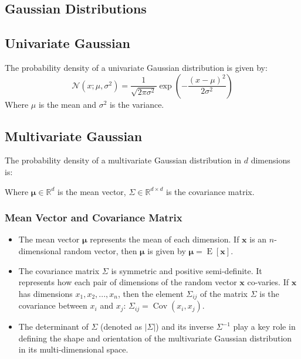 \documentclass[8pt, a4paper, landscape, includeheadfoot]{extarticle}
\begin{document}
\begin{multicols*}{4}
	\section{Gaussian Distributions}
	\subsection{Univariate Gaussian}
	The probability density of a univariate Gaussian distribution is given by:
	$$
		\mathcal{N}(x ; \mu, \sigma^2) = \frac{1}{\sqrt{2\pi \sigma^2}} \exp\left( -\frac{(x-\mu)^2}{2\sigma^2} \right)
	$$
	Where $\mu$ is the mean and $\sigma^2$ is the variance.

	\subsection{Multivariate Gaussian}
	The probability density of a multivariate Gaussian distribution in $d$ dimensions is:

	\vskip5pt

	\vskip5pt

	Where $\boldsymbol{\mu}\in\mathbb{R}^d$ is the mean vector, $\Sigma\in\mathbb{R}^{d\times d}$ is the covariance matrix.

	\subsubsection{Mean Vector and Covariance Matrix}{}
	\begin{itemize}
		\item The mean vector \(\boldsymbol{\mu}\) represents the mean of each dimension. If \(\mathbf{x}\) is an \(n\)-dimensional random vector, then \(\boldsymbol{\mu}\) is given by \(\boldsymbol{\mu} = \operatorname{E}[\mathbf{x}]\).
		\item The covariance matrix \(\Sigma\) is symmetric and positive semi-definite. It represents how each pair of dimensions of the random vector \(\mathbf{x}\) co-varies. If \(\mathbf{x}\) has dimensions \(x_1, x_2, ..., x_n\), then the element \(\Sigma_{ij}\) of the matrix \(\Sigma\) is the covariance between \(x_i\) and \(x_j\): \(\Sigma_{ij} = \operatorname{Cov}(x_i, x_j)\).
		\item The determinant of \(\Sigma\) (denoted as \(|\Sigma|\)) and its inverse \(\Sigma^{-1}\) play a key role in defining the shape and orientation of the multivariate Gaussian distribution in its multi-dimensional space.
	\end{itemize}


\end{multicols*}
\end{document}
